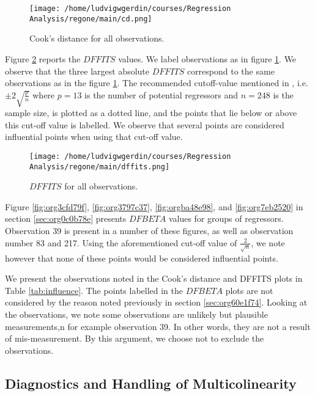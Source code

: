 \documentclass[11pt]{article}
\begin{document}
\begin{figure}[h]
\centering
\texttt{[image: /home/ludvigwgerdin/courses/Regression Analysis/regone/main/cd.png]}
\caption{\label{fig:org6c4a6b5}
Cook's distance for all observations.}
\end{figure}

Figure \ref{fig:org6fe0708} reports the \(DFFITS\) values. We label observations as in figure \ref{fig:org6c4a6b5}. We observe 
that the three largest absolute \(DFFITS\) correspond to the same observations as in the figure \ref{fig:org6c4a6b5}. 
The recommended cutoff-value mentioned in \cite{Montgomery2012}, i.e. \(\pm 2\sqrt{\frac{p}{n}}\)
where \(p = 13\) is the number of potential regressors and \(n = 248\) is the sample size, is 
plotted as a dotted line, and the points that lie below or above this cut-off value is labelled.
We observe that several points are considered influential points when using that cut-off value.

\begin{figure}[h]
\centering
\texttt{[image: /home/ludvigwgerdin/courses/Regression Analysis/regone/main/dffits.png]}
\caption{\label{fig:org6fe0708}
\(DFFITS\) for all observations.}
\end{figure}

Figure \ref{fig:org3cfd79f}, \ref{fig:org3797c37}, \ref{fig:orgba48e98}, and
\ref{fig:org7eb2520} in section \ref{sec:org0c0b78e} presents \(DFBETA\) values for groups of regressors. 
Observation 39 is present in a number of these figures, as well as observation number 83 and 217. 
Using the aforementioned cut-off value of \(\frac{2}{\sqrt{n}}\), we note however that none of these points
would be considered influential points.

We present the observations noted in the Cook's distance and DFFITS plots in Table \ref{tab:influence}.
The points labelled in the \(DFBETA\) plots are not considered by the reason noted previously 
in section \ref{sec:org60e1f74}. Looking at the observations, we note some observations are unlikely but 
plausible measurements,n for example observation 39. In other words, they are not a result of mis-measurement.
By this argument, we choose not to exclude the observations. 



\subsection{Diagnostics and Handling of Multicolinearity}
\label{sec:org99181f9}
\end{document}
